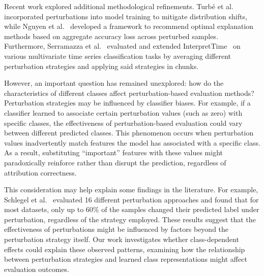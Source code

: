 Recent work explored additional methodological refinements. Turbé et al.~\cite{turbe.etal_2023_evaluation} incorporated perturbations into model training to mitigate distribution shifts, while Nguyen et al.~\cite{nguyen.etal_2024_robust} developed a framework to recommend optimal explanation methods based on aggregate accuracy loss across perturbed samples.
Furthermore, Serramazza et al.~\cite{serramazza.etal_2024_improving} evaluated and extended InterpretTime~\cite{turbe.etal_2023_evaluation} on various multivariate time series classification tasks by averaging different perturbation strategies and applying said strategies in chunks.

However, an important question has remained unexplored: how do the characteristics of different classes affect perturbation-based evaluation methods? Perturbation strategies may be influenced by classifier biases. For example, if a classifier learned to associate certain perturbation values (such as zero) with specific classes, the effectiveness of perturbation-based evaluation could vary between different predicted classes. 
This phenomenon occurs when perturbation values inadvertently match features the model has associated with a specific class. As a result, substituting ``important'' features with these values might paradoxically reinforce rather than disrupt the prediction, regardless of attribution correctness.

This consideration may help explain some findings in the literature. For example, Schlegel et al.~\cite{schlegel.keim_2023_deep} evaluated 16 different perturbation approaches and found that for most datasets, only up to 60\% of the samples changed their predicted label under perturbation, regardless of the strategy employed. These results suggest that the effectiveness of perturbations might be influenced by factors beyond the perturbation strategy itself. Our work investigates whether class-dependent effects could explain these observed patterns, examining how the relationship between perturbation strategies and learned class representations might affect evaluation outcomes.